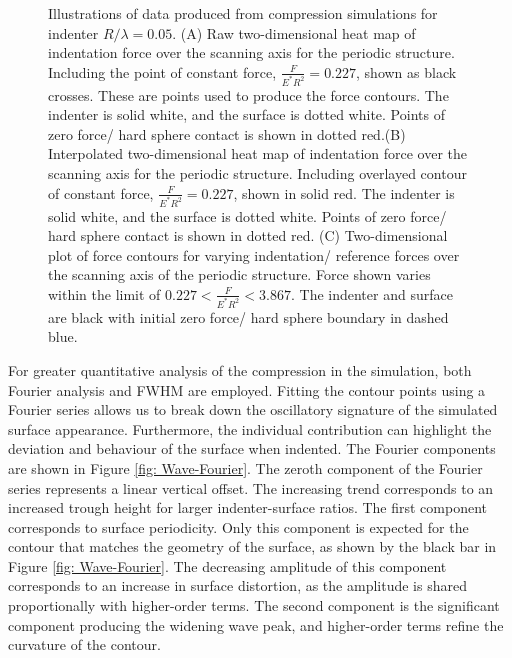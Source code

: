 \begin{figure}[ht]
    \caption{\label{fig: Wave-ContourPlot}Illustrations of data produced from compression simulations for indenter $R/\lambda=0.05$. (A) Raw two-dimensional heat map of indentation force over the scanning axis for the periodic structure. Including the point of constant force, $\frac{F}{E^*R^2} = 0.227 $, shown as black crosses. These are points used to produce the force contours. The indenter is solid white, and the surface is dotted white. Points of zero force/ hard sphere contact is shown in dotted red.(B) Interpolated two-dimensional heat map of indentation force over the scanning axis for the periodic structure. Including overlayed contour of constant force, $\frac{F}{E^*R^2} = 0.227 $, shown in solid red. The indenter is solid white, and the surface is dotted white. Points of zero force/ hard sphere contact is shown in dotted red. (C) Two-dimensional plot of force contours for varying indentation/ reference forces over the scanning axis of the periodic structure. Force shown varies within the limit of $ 0.227 < \frac{F}{E^*R^2} < 3.867 $. The indenter and surface are black with initial zero force/ hard sphere boundary in dashed blue.}
    
\end{figure}

For greater quantitative analysis of the compression in the simulation, both Fourier analysis and FWHM are employed. Fitting the contour points using a Fourier series allows us to break down the oscillatory signature of the simulated surface appearance. Furthermore, the individual contribution can highlight the deviation and behaviour of the surface when indented. The Fourier components are shown in Figure \ref{fig: Wave-Fourier}. The zeroth component of the Fourier series represents a linear vertical offset. The increasing trend corresponds to an increased trough height for larger indenter-surface ratios. The first component corresponds to surface periodicity. Only this component is expected for the contour that matches the geometry of the surface, as shown by the black bar in Figure \ref{fig: Wave-Fourier}. The decreasing amplitude of this component corresponds to an increase in surface distortion, as the amplitude is shared proportionally with higher-order terms. The second component is the significant component producing the widening wave peak, and higher-order terms refine the curvature of the contour. 

